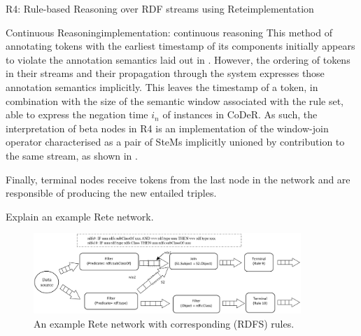 \begin{nestedsection}{R4: Rule-based Reasoning over RDF streams using Rete}{implementation}
\begin{nestedsection}{Continuous Reasoning}{implementation: continuous reasoning}
		This method of annotating tokens with the earliest timestamp of its components initially appears to violate the annotation semantics laid out in .
		However, the ordering of tokens in their streams and their propagation through the system expresses those annotation semantics implicitly.
		This leaves the timestamp of a token, in combination with the size of the semantic window associated with the rule set, able to express the negation time $i_n$ of instances in CoDeR.
		As such, the interpretation of beta nodes in R4 is an implementation of the window-join operator characterised as a pair of SteMs implicitly unioned by contribution to the same stream, as shown in .

 		Finally, terminal nodes receive tokens from the last node in the network and are responsible of producing the new entailed triples.

 		Explain an example Rete network.

 		\begin{figure}[t]
 			\centering
 			\includegraphics[width=0.9\textwidth]{example-rete-network.png}
 			\caption{An example Rete network with corresponding (RDFS) rules.}
 		\end{figure}
	\end{nestedsection}
\end{nestedsection}
